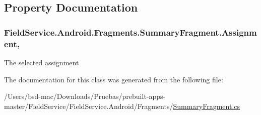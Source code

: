 \subsection{Property Documentation}
\hypertarget{class_field_service_1_1_android_1_1_fragments_1_1_summary_fragment_a8ca6fdc8b7a9997f68353b19bf1fb702}{
\subsubsection[{Assignment}]{ Field\+Service.\+Android.\+Fragments.\+Summary\+Fragment.\+Assignment\hspace{0.3cm}{\ttfamily [get]}, {\ttfamily [set]}}}\label{class_field_service_1_1_android_1_1_fragments_1_1_summary_fragment_a8ca6fdc8b7a9997f68353b19bf1fb702}


The selected assignment 



The documentation for this class was generated from the following file\+:\begin{DoxyCompactItemize}
\item 
/\+Users/bsd-\/mac/\+Downloads/\+Pruebas/prebuilt-\/apps-\/master/\+Field\+Service/\+Field\+Service.\+Android/\+Fragments/\hyperlink{_summary_fragment_8cs}{Summary\+Fragment.\+cs}\end{DoxyCompactItemize}
